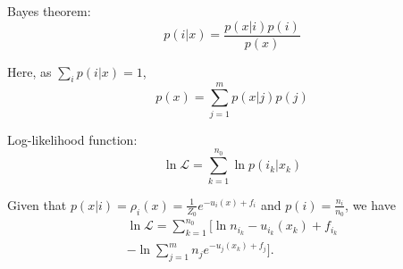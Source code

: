 \documentclass[aip,jcp,reprint,amsmath,amssymb]{revtex4-1}
\begin{document}
Bayes theorem:
\begin{equation}
p(i|x) = \frac{p(x|i) p(i)}{p(x)}
\end{equation}

Here, as $\sum_i p(i|x) = 1$,
\begin{equation*}
p(x) = \sum_{j=1}^m p(x|j) p(j)
\end{equation*}

Log-likelihood function:
\begin{equation}
\ln \mathcal{L} = \sum_{k=1}^{n_0} \ln p(i_k|x_k)
\end{equation}

Given that $p(x|i) = \rho_i(x) = \frac{1}{Z_0}e^{-u_i(x)+f_i}$ and $p(i) = \frac{n_i}{n_0}$, we have
\begin{align}
\ln \mathcal{L} = \sum_{k=1}^{n_0} \Bigg[\ln n_{i_k} - u_{i_k}(x_k) + f_{i_k} \\ - \ln \sum_{j=1}^m n_j e^{-u_j(x_k) + f_j}\Bigg].
\end{align}


\end{document}
